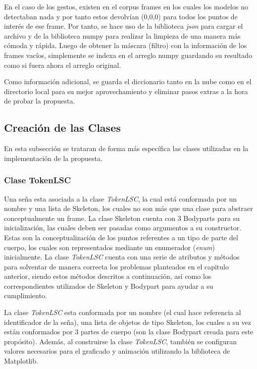 En el caso de los gestos, existen en el corpus frames en los cuales los modelos no detectaban nada y por tanto estos devolvían (0,0,0) para todos los puntos de interés de ese frame. Por tanto, se hace uso de la biblioteca \textit{json} para cargar el archivo y de la biblioteca numpy para realizar la limpieza de una manera más cómoda y rápida.
Luego de obtener la máscara (filtro) con la información de los frames vacíos, simplemente se indexa en el arreglo numpy guardando su resultado como si fuera ahora el arreglo original.

Como información adicional, se guarda el diccionario tanto en la nube como en el directorio local para su mejor aprovechamiento y eliminar pasos extras a la hora de probar la propuesta.





%
%


\subsection{Creación de las Clases}
En esta subsección se trataran de forma más específica las clases utilizadas en la implementación de la propuesta.

\subsubsection{Clase TokenLSC}

Una seña esta asociada a la clase \textit{TokenLSC}, la cual está conformada  por un nombre y una lista de Skeleton, los cuales no son más que una clase para abstraer conceptualmente un frame. La clase Skeleton cuenta con 3 Bodyparts para su inicialización, las cuales deben ser pasadas como argumentos a su constructor. Estas son la conceptualización de los puntos referentes a un tipo de parte del cuerpo, los cuales son representados mediante un enumerador (\textit{enum}) inicialmente.
La clase \textit{TokenLSC} cuenta con una serie de atributos y métodos para solventar de manera correcta los problemas planteados en el capitulo anterior, siendo estos métodos descritos a continuación, así como los correspondientes utilizados de Skeleton y Bodypart para ayudar a su cumplimiento.

La clase \textit{TokenLSC} esta conformada por un nombre (el cual hace referencia al identificador de la seña),  una lista de objetos de tipo Skeleton, los cuales a su vez están conformados  por 3 partes de cuerpo (son la clase Bodypart creada para este propósito). Además, al construirse la clase \textit{TokenLSC}, también se configuran valores necesarios para el graficado y animación utilizando la biblioteca de Matplotlib.

